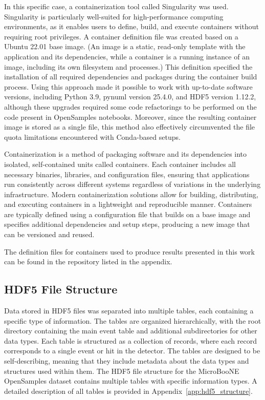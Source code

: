 \documentclass{pracalicmgr}
\begin{document}
In this specific case, a containerization tool called Singularity was used. Singularity is particularly well-suited for high-performance computing environments, as it enables users to define, build, and execute containers without requiring root privileges. A container definition file was created based on a Ubuntu 22.01 base image. (An image is a static, read-only template with the application and its dependencies, while a container is a running instance of an image, including its own filesystem and processes.) This definition specified the installation of all required dependencies and packages during the container build process. Using this approach made it possible to work with up-to-date software versions, including Python 3.9, pynuml version 25.4.0, and HDF5 version 1.12.2, although these upgrades required some code refactorings to be performed on the code present in OpenSamples notebooks. Moreover, since the resulting container image is stored as a single file, this method also effectively circumvented the file quota limitations encountered with Conda-based setups.


Containerization is a method of packaging software and its dependencies into isolated, self-contained units called containers. Each container includes all necessary binaries, libraries, and configuration files, ensuring that applications run consistently across different systems regardless of variations in the underlying infrastructure. Modern containerization solutions allow for building, distributing, and executing containers in a lightweight and reproducible manner. Containers are typically defined using a configuration file that builds on a base image and specifies additional dependencies and setup steps, producing a new image that can be versioned and reused.

The definition files for containers used to produce results presented in this work can be found in the repository listed in the appendix.


\subsection{HDF5 File Structure}

Data stored in HDF5 files was separated into multiple tables, each containing a specific type of information. The tables are organized hierarchically, with the root directory containing the main event table and additional subdirectories for other data types. Each table is structured as a collection of records, where each record corresponds to a single event or hit in the detector. The tables are designed to be self-describing, meaning that they include metadata about the data types and structures used within them.
The HDF5 file structure for the MicroBooNE OpenSamples dataset contains multiple tables with specific information types. A detailed description of all tables is provided in Appendix~\ref{app:hdf5_structure}.
\end{document}
